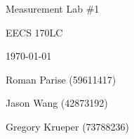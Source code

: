 \centering
\vspace*{5cm}
{\huge Measurement Lab \#1 \par}
{\Large EECS 170LC \par}
{\Large \today \par}
\vspace{1cm}
{\large Roman Parise (59611417) \par}
{\large Jason Wang (42873192) \par}
{\large Gregory Krueper (73788236) \par}
\vspace{1cm}
